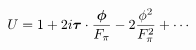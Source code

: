 \begin{equation}
U= 1+ 2i \mbox{\boldmath$\tau$}\cdot\frac{\mbox{\boldmath$\phi$}}{F_\pi} - 2\frac{\phi^2}{F_\pi^2} +\cdots
\end{equation}

